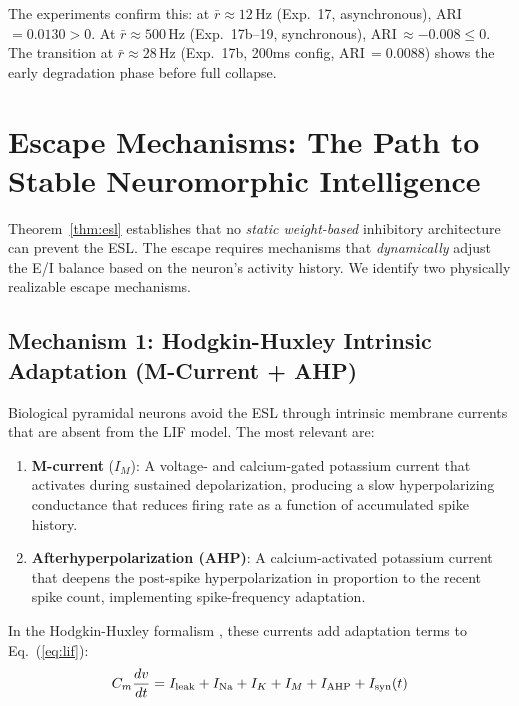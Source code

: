 \documentclass{article}
\begin{document}
The experiments confirm this: at $\bar{r} \approx 12$\,Hz (Exp.~17, asynchronous), ARI\,$= 0.0130 > 0$. At $\bar{r} \approx 500$\,Hz (Exp.~17b--19, synchronous), ARI\,$\approx -0.008 \leq 0$. The transition at $\bar{r} \approx 28$\,Hz (Exp.~17b, 200ms config, ARI\,$= 0.0088$) shows the early degradation phase before full collapse.

\section{Escape Mechanisms: The Path to Stable Neuromorphic Intelligence}
\label{sec:escape}

Theorem~\ref{thm:esl} establishes that no \textit{static weight-based} inhibitory architecture can prevent the ESL. The escape requires mechanisms that \textit{dynamically} adjust the E/I balance based on the neuron's activity history. We identify two physically realizable escape mechanisms.

\subsection{Mechanism 1: Hodgkin-Huxley Intrinsic Adaptation (M-Current + AHP)}

Biological pyramidal neurons avoid the ESL through intrinsic membrane currents that are absent from the LIF model. The most relevant are:

\begin{enumerate}[label=(\roman*)]
  \item \textbf{M-current} ($I_M$): A voltage- and calcium-gated potassium current that activates during sustained depolarization, producing a slow hyperpolarizing conductance that reduces firing rate as a function of accumulated spike history.
  \item \textbf{Afterhyperpolarization (AHP)}: A calcium-activated potassium current that deepens the post-spike hyperpolarization in proportion to the recent spike count, implementing spike-frequency adaptation.
\end{enumerate}

In the Hodgkin-Huxley formalism \citep{hodgkin1952}, these currents add adaptation terms to Eq.~(\ref{eq:lif}):
\begin{equation}
C_m \frac{dv}{dt} = I_{\rm leak} + I_{\rm Na} + I_K + I_M + I_{\rm AHP} + I_{\rm syn}(t)
\label{eq:hh}
\end{equation}
\end{document}
